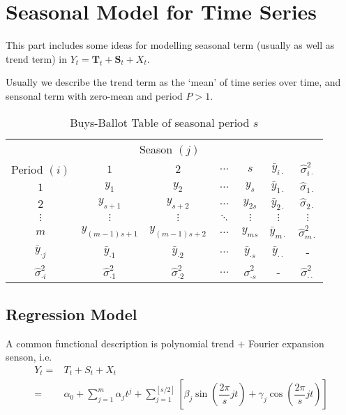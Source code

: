     
\section{Seasonal Model for Time Series}
    This part includes some ideas for modelling seasonal term (usually as well as trend term) in $ Y_t=\mathbf{T}_t+\mathbf{S}_t+X_t $.

    Usually we describe the trend term as the `mean' of time series over time, and sensonal term with zero-mean and period $ P>1 $.




\begin{table}[H]
    \centering
    \renewcommand\arraystretch{1}
    \caption{Buys-Ballot Table of seasonal period $ s $}
    \begin{tabular}{ccccc|cc}
        \hline
        \hline
        &\multicolumn{4}{c|}{Season $ (j) $}&&\\
        \cline{2-5}
        Period $ (i) $&$ 1 $&$ 2 $&$ \ldots $&$ s $&$ \bar{y}_{i\cdot} $&$ \hat{\sigma }^2_{i\cdot} $\\
        \hline
        $ 1 $&$ y_{1} $&$ y_2 $&$ \ldots $&$ y_s $&$ \bar{y}_{1\cdot} $&$ \hat{\sigma }_{1\cdot} $\\
        $ 2 $&$ y_{s+1} $&$ y_{s+2} $&$ \ldots $&$ y_{2s} $&$ \bar{y}_{2\cdot} $&$ \hat{\sigma }_{2\cdot} $\\
        $ \vdots $&$ \vdots $&$ \vdots $&$ \ddots $&$ \vdots $&$ \vdots $&$ \vdots $\\
        $ m $&$ y_{(m-1)s+1} $&$ y_{(m-1)s+2} $&$ \ldots $&$ y_{ms } $&$ \bar{y}_{m\cdot} $&$ \hat{\sigma }^2_{m\cdot} $\\
        \hline
        $ \bar{y}_{\cdot j} $&$ \bar{y}_{\cdot 1} $&$ \bar{y}_{\cdot 2} $&$ \ldots $&$ \bar{y}_{\cdot s} $&$ \bar{y}_{\cdot\cdot} $&-\\
        $ \hat{\sigma }^2_{\cdot i} $&$ \hat{\sigma }^2_{\cdot 1} $&$ \hat{\sigma }^2_{\cdot 2} $&$ \ldots $&$ \hat{\sigma }^2_{\cdot s} $&-&$ \hat{\sigma }^2_{\cdot \cdot} $\\
        \hline
        \hline
    \end{tabular}
    \label{}
\end{table}



\subsection{Regression Model}
    A common functional description is polynomial trend $ + $ Fourier expansion senson, i.e.
    \begin{align}
        Y_t=&T_t+S_t+X_t\\
        =&\alpha _0+\sum_{j=1}^m\alpha _jt^j+\sum_{j=1}^{[s/2]}\left[\beta _j\sin(\dfrac{2\pi }{s}jt)+\gamma _j\cos(\dfrac{2\pi}{s}jt)\right]
    \end{align}

